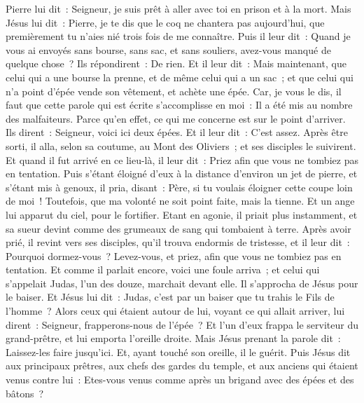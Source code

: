\begin{multicols}{2}
Pierre lui dit~: Seigneur, je suis prêt à aller avec toi en prison et à la mort.
Mais Jésus lui dit~: Pierre, je te dis que le coq ne chantera pas aujourd'hui, que premièrement tu n'aies nié trois fois de me connaître.
Puis il leur dit~: Quand je vous ai envoyés sans bourse, sans sac, et sans souliers, avez-vous manqué de quelque chose~? Ils répondirent~: De rien.
Et il leur dit~: Mais maintenant, que celui qui a une bourse la prenne, et de même celui qui a un sac~; et que celui qui n'a point d'épée vende son vêtement, et achète une épée.
Car, je vous le dis, il faut que cette parole qui est écrite s'accomplisse en moi~: Il a été mis au nombre des malfaiteurs. Parce qu'en effet, ce qui me concerne est sur le point d'arriver.
Ils dirent~: Seigneur, voici ici deux épées. Et il leur dit~: C'est assez.
Après être sorti, il alla, selon sa coutume, au Mont des Oliviers~; et ses disciples le suivirent.
Et quand il fut arrivé en ce lieu-là, il leur dit~: Priez afin que vous ne tombiez pas en tentation.
Puis s'étant éloigné d'eux à la distance d'environ un jet de pierre, et s'étant mis à genoux, il pria,
disant~: Père, si tu voulais éloigner cette coupe loin de moi~! Toutefois, que ma volonté ne soit point faite, mais la tienne.
Et un ange lui apparut du ciel, pour le fortifier.
Etant en agonie, il priait plus instamment, et sa sueur devint comme des grumeaux de sang qui tombaient à terre.
Après avoir prié, il revint vers ses disciples, qu'il trouva endormis de tristesse,
et il leur dit~: Pourquoi dormez-vous~? Levez-vous, et priez, afin que vous ne tombiez pas en tentation.
Et comme il parlait encore, voici une foule arriva~; et celui qui s'appelait Judas, l'un des douze, marchait devant elle. Il s'approcha de Jésus pour le baiser.
Et Jésus lui dit~: Judas, c'est par un baiser que tu trahis le Fils de l'homme~?
Alors ceux qui étaient autour de lui, voyant ce qui allait arriver, lui dirent~: Seigneur, frapperons-nous de l'épée~?
Et l'un d'eux frappa le serviteur du grand-prêtre, et lui emporta l'oreille droite.
Mais Jésus prenant la parole dit~: Laissez-les faire jusqu'ici. Et, ayant touché son oreille, il le guérit.
Puis Jésus dit aux principaux prêtres, aux chefs des gardes du temple, et aux anciens qui étaient venus contre lui~: Etes-vous venus comme après un brigand avec des épées et des bâtons~?

\end{multicols}
